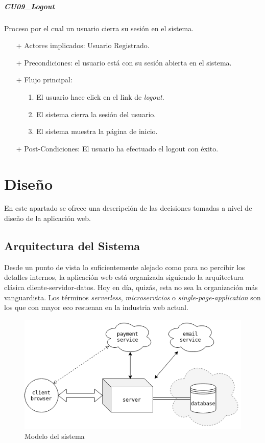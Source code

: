 \documentclass[a4paper]{article}
\begin{document}
            \subparagraph{CU09\_Logout}
                Proceso por el cual un usuario cierra su sesión en el sistema.
                \begin{itemize}
                    \item[+] Actores implicados: Usuario Registrado.
                    \item[+] Precondiciones: el usuario está con su sesión abierta en el sistema.
                    \item[+] Flujo principal:
                    \begin{enumerate}
                        \item[1.] El usuario hace click en el link de \emph{logout}.
                        \item[2.] El sistema cierra la sesión del usuario.
                        \item[3.] El sistema muestra la página de inicio.
                    \end{enumerate}
                    \item[+] Post-Condiciones: El usuario ha efectuado el logout con éxito.
                \end{itemize}


    \section{Diseño}
    En este apartado se ofrece una descripción de las decisiones tomadas a nivel de diseño de la aplicación web.
    \subsection{Arquitectura del Sistema}
    Desde un punto de vista lo suficientemente alejado como para no percibir los detalles internos, la aplicación web está organizada siguiendo la arquitectura clásica cliente-servidor-datos. Hoy en día, quizás, esta no sea la organización más vanguardista. Los términos \emph{serverless}, \emph{microservicios} o \emph{single-page-application} son los que con mayor eco resuenan en la industria web actual.
    
    \begin{figure}[h]
    	\centering
    	\includegraphics[width=\textwidth]{desing_general}
    	\caption{Modelo del sistema}
    	\label{fig:desing_general}
    \end{figure}
    
\end{document}
